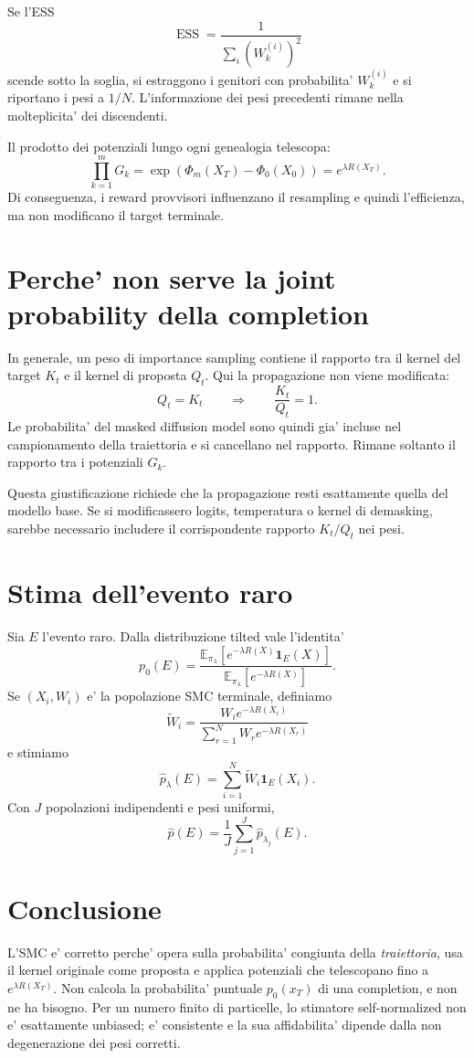 \documentclass[11pt]{article}
\begin{document}
Se l'ESS
\[
\operatorname{ESS}=\frac{1}{\sum_i (W_k^{(i)})^2}
\]
scende sotto la soglia, si estraggono i genitori con probabilita'
$W_k^{(i)}$ e si riportano i pesi a $1/N$. L'informazione dei pesi precedenti
rimane nella molteplicita' dei discendenti.

Il prodotto dei potenziali lungo ogni genealogia telescopa:
\[
\prod_{k=1}^{m}G_k
=\exp\!\left(\Phi_m(X_T)-\Phi_0(X_0)\right)
=e^{\lambda R(X_T)}.
\]
Di conseguenza, i reward provvisori influenzano il resampling e quindi
l'efficienza, ma non modificano il target terminale.

\section{Perche' non serve la joint probability della completion}

In generale, un peso di importance sampling contiene il rapporto tra il
kernel del target $K_t$ e il kernel di proposta $Q_t$. Qui la propagazione
non viene modificata:
\[
Q_t=K_t
\qquad\Longrightarrow\qquad
\frac{K_t}{Q_t}=1.
\]
Le probabilita' del masked diffusion model sono quindi gia' incluse nel
campionamento della traiettoria e si cancellano nel rapporto. Rimane soltanto
il rapporto tra i potenziali $G_k$.

Questa giustificazione richiede che la propagazione resti esattamente quella
del modello base. Se si modificassero logits, temperatura o kernel di
demasking, sarebbe necessario includere il corrispondente rapporto
$K_t/Q_t$ nei pesi.

\section{Stima dell'evento raro}

Sia $E$ l'evento raro. Dalla distribuzione tilted vale l'identita'
\[
p_0(E)
=\frac{
\mathbb E_{\pi_\lambda}
\left[e^{-\lambda R(X)}\mathbf 1_E(X)\right]
}{
\mathbb E_{\pi_\lambda}
\left[e^{-\lambda R(X)}\right]
}.
\]
Se $(X_i,W_i)$ e' la popolazione SMC terminale, definiamo
\[
\widetilde W_i
=\frac{W_i e^{-\lambda R(X_i)}}
{\sum_{r=1}^{N}W_r e^{-\lambda R(X_r)}}
\]
e stimiamo
\[
\widehat p_\lambda(E)
=\sum_{i=1}^{N}\widetilde W_i\mathbf 1_E(X_i).
\]
Con $J$ popolazioni indipendenti e pesi uniformi,
\[
\widehat p(E)=\frac{1}{J}\sum_{j=1}^{J}\widehat p_{\lambda_j}(E).
\]

\section*{Conclusione}

L'SMC e' corretto perche' opera sulla probabilita' congiunta della
\emph{traiettoria}, usa il kernel originale come proposta e applica
potenziali che telescopano fino a $e^{\lambda R(X_T)}$. Non calcola la
probabilita' puntuale $p_0(x_T)$ di una completion, e non ne ha bisogno.
Per un numero finito di particelle, lo stimatore self-normalized non e'
esattamente unbiased; e' consistente e la sua affidabilita' dipende dalla
non degenerazione dei pesi corretti.
\end{document}
